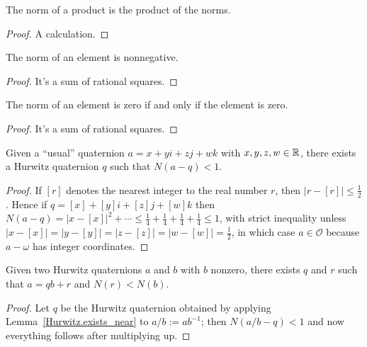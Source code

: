 \begin{lemma}
    \label{Hurwitz.norm_mul}
    \leanok
    The norm of a product is the product of the norms.
\end{lemma}
\begin{proof}
    \leanok
    A calculation.
\end{proof}

\begin{lemma}
    \label{Hurwitz.norm_nonneg}
    \leanok
    The norm of an element is nonnegative.
\end{lemma}
\begin{proof} \leanok
    It's a sum of rational squares.
\end{proof}

\begin{lemma}
    \label{Hurwitz.norm_eq_zero}
    \leanok
    The norm of an element is zero if and only if the element is zero.
\end{lemma}
\begin{proof}
    \leanok
    It's a sum of rational squares.
\end{proof}

\begin{lemma}
    \label{Hurwitz.exists_near}
    Given a ``usual'' quaternion $a=x+yi+zj+wk$ with $x,y,z,w\in\mathbb{R}$,
    there exists a Hurwitz quaternion $q$ such that $N(a-q)<1$.
\end{lemma}
\begin{proof}
  If $[r]$ denotes the nearest integer to the real number $r$, then $|r-[r]|\leq \frac{1}{2}$.
  Hence if $q=[x]+[y]i+[z]j+[w]k$ then $N(a-q)=|x-[x]|^2+\cdots
  \leq \frac{1}{4}+\frac{1}{4}+\frac{1}{4}+\frac{1}{4}\leq 1$, with strict inequality unless
  $|x-[x]|=|y-[y]|=|z-[z]|=|w-[w]|=\frac{1}{2}$, in which case $a\in\mathcal{O}$ because $a-\omega$
  has integer coordinates.
\end{proof}

\begin{lemma}
    \label{Hurwitz.quot_rem}
    \leanok
    Given two Hurwitz quaternions $a$ and $b$ with $b$ nonzero, there exists
    $q$ and $r$ such that $a=qb+r$ and $N(r)<N(b)$.
\end{lemma}
\begin{proof}
  Let $q$ be the Hurwitz quaternion obtained by applying Lemma~\ref{Hurwitz.exists_near}
  to $a/b := ab^{-1}$; then $N(a/b-q)<1$ and now everything follows after multiplying up.
\end{proof}

